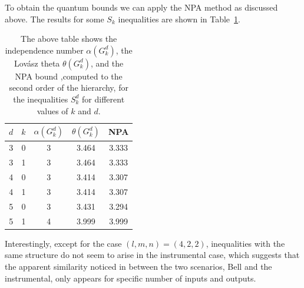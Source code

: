 \documentclass[letterpaper]{article}
\begin{document}
To obtain the quantum bounds we can apply the NPA method as discussed above.
The results for some $S_k$ inequalities are shown in Table~\ref{tab:gclmps}.
\begin{table}
    \centering
    \begin{tabular}{ccccc}
        $d$ & $k$ & $\alpha(G^d_k)$ & $\theta(G^d_k)$ & NPA \\
        \toprule
         3 & 0 & 3 & 3.464 & 3.333 \\
         3 & 1 & 3 & 3.464 & 3.333 \\
        \midrule
         4 & 0 & 3 & 3.414 & 3.307 \\
         4 & 1 & 3 & 3.414 & 3.307 \\
        \midrule
         5 & 0 & 3 & 3.431 & 3.294 \\
         5 & 1 & 4 & 3.999 & 3.999 \\
        \bottomrule
    \end{tabular}
    \caption{The above table shows the independence number $\alpha(G^d_k)$, the
    Lov\'asz theta $\theta(G^d_k)$, and the NPA bound ,computed to the second
    order of the hierarchy, for the inequalities $S^d_k$ for different values of $k$
    and $d$.}
    \label{tab:gclmps}
\end{table}
        
Interestingly, except for the case $(l,m,n) = (4,2,2)$, inequalities with the
same structure do not seem to arise in the instrumental case, which suggests
that the apparent similarity noticed in \cite{himbeeck2018} between the two scenarios, Bell and the
instrumental, only appears for specific number of inputs and outputs. 
\end{document}
